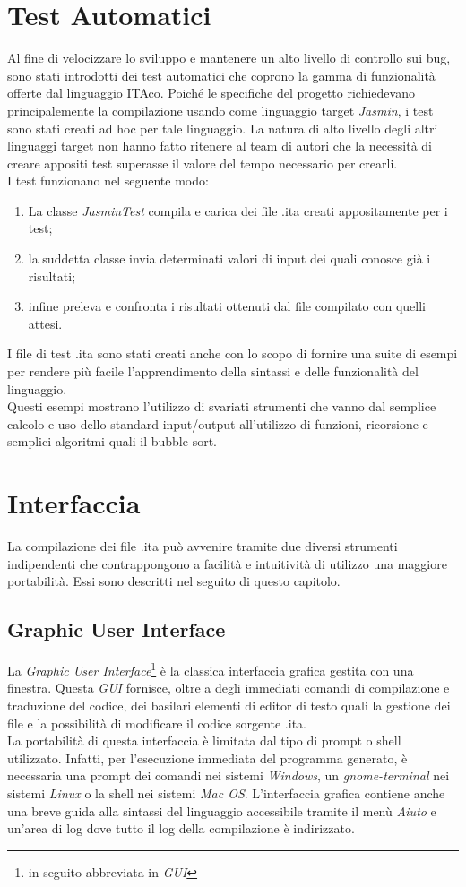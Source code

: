 \documentclass[11pt, a4paper, twoside, notitlepage]{report}
\begin{document}
\section{Test Automatici}
Al fine di velocizzare lo sviluppo e mantenere un alto livello di controllo sui
bug, sono stati introdotti dei test automatici che coprono la gamma di
funzionalità offerte dal linguaggio ITAco. Poiché le specifiche del progetto
richiedevano principalemente la compilazione usando come linguaggio target
\emph{Jasmin}, i test sono stati creati ad hoc per tale linguaggio. La natura di
alto livello degli altri linguaggi target non hanno fatto ritenere al team di
autori che la necessità di creare appositi test superasse il valore del tempo
necessario per crearli.
\\I test funzionano nel seguente modo:
\begin{enumerate}
  \item La classe \emph{JasminTest} compila e carica dei file .ita creati
  appositamente per i test;
  \item la suddetta classe invia determinati valori di input dei quali conosce
  già i risultati;
  \item infine preleva e confronta i risultati ottenuti dal file compilato con
  quelli attesi.
\end{enumerate}
I file di test .ita sono stati creati anche con lo scopo di fornire una suite di
esempi per rendere più facile l'apprendimento della sintassi e delle
funzionalità del linguaggio.
\\Questi esempi mostrano l'utilizzo di svariati strumenti che vanno dal semplice
calcolo e uso dello standard input/output all'utilizzo di funzioni, ricorsione e
semplici algoritmi quali il bubble sort.

\section{Interfaccia}
\label{gui}
La compilazione dei file .ita può avvenire tramite due diversi strumenti
indipendenti che contrappongono a facilità e intuitività di utilizzo una
maggiore portabilità. Essi sono descritti nel seguito di questo capitolo.
\subsection{Graphic User Interface}
La \emph{Graphic User Interface}\footnote{in seguito abbreviata in \emph{GUI}} è
la classica interfaccia grafica gestita con una finestra. Questa \emph{GUI}
fornisce, oltre a degli immediati comandi di compilazione e traduzione del
codice, dei basilari elementi di editor di testo quali la gestione dei file e
la possibilità di modificare il codice sorgente .ita.
\\La portabilità di questa interfaccia è limitata dal tipo di prompt o shell
utilizzato. Infatti, per l'esecuzione immediata del programma generato, è
necessaria una prompt dei comandi nei sistemi \emph{Windows}, un
\emph{gnome-terminal} nei sistemi \emph{Linux} o la shell nei sistemi
\emph{Mac OS}.
L'interfaccia grafica contiene anche una breve guida alla sintassi del
linguaggio accessibile tramite il menù \emph{Aiuto} e un'area di log dove tutto
il log della compilazione è indirizzato.
\end{document}
